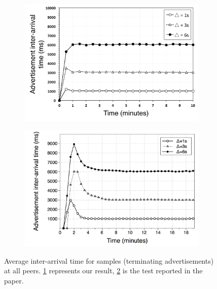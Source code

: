 \begin{figure}
\centering
\begin{subfigure}{.5\textwidth}
  \centering
  \includegraphics[keepaspectratio=true, width=1\linewidth]{images/average_interarrivaltime}
  \caption{}
  \label{fig:average_interarrivaltime}
\end{subfigure}%
\begin{subfigure}{.5\textwidth}
  \centering
  \includegraphics[keepaspectratio=true, width=1\linewidth]{images/paper_average_interarrivaltime}
  \caption{}
  \label{fig:paper_average_interarrivaltime}
\end{subfigure}
\caption{Average inter-arrival time for samples (terminating advertisements) at all peers. \ref{fig:average_interarrivaltime} represents our result, \ref{fig:paper_average_interarrivaltime} is the test reported in the paper.}
\label{fig:ad_average_interarrivaltime}
\end{figure}


